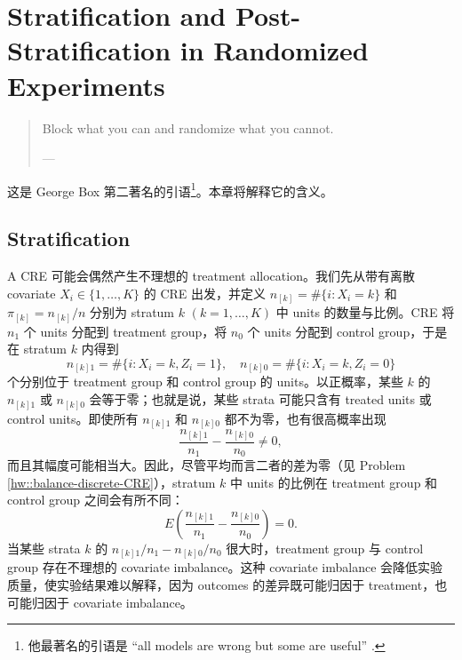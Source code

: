 
\chapter{Stratification and Post-Stratification in Randomized Experiments}
\label{chapter::stratification-poststratification}

\begin{quotation}
Block what you can and randomize what you cannot.  

--- \citet[][page 103]{box1978statistics}
\end{quotation}

这是 George Box 第二著名的引语\footnote{他最著名的引语是 ``all models are wrong but some are useful'' \citep[][page 202]{box1979robustness}.}。本章将解释它的含义。



\section{Stratification}



A CRE 可能会偶然产生不理想的 treatment allocation。我们先从带有离散 covariate $X_i   \in \{ 1, \ldots, K \}$ 的 CRE 出发，并定义 $n_{[k]} = \#\{ i: X_i    =k  \}$ 和 $\pi_{[k]} = n_{[k]} / n$ 分别为 stratum $k$ $(k=1, \ldots, K)$ 中 units 的数量与比例。CRE 将 $n_1$ 个 units 分配到 treatment group，将 $n_0$ 个 units 分配到 control group，于是在 stratum $k$ 内得到
$$
n_{[k]1} = \#\{ i: X_i   = k, Z_i = 1 \},\quad
n_{[k]0} = \#\{ i: X_i   = k, Z_i = 0 \}
$$
个分别位于 treatment group 和 control group 的 units。以正概率，某些 $k$ 的 $n_{[k]1}$ 或 $n_{[k]0}$ 会等于零；也就是说，某些 strata 可能只含有 treated units 或 control units。即使所有 $n_{[k]1}$ 和 $n_{[k]0}$ 都不为零，也有很高概率出现
\begin{equation}
\frac{  n_{[k]1} }{n_1}  -  \frac{  n_{[k]0} }{n_0} \neq 0 ,
\label{eq::covarianceimbK}
\end{equation} 
而且其幅度可能相当大。因此，尽管平均而言二者的差为零（见 Problem \ref{hw::balance-discrete-CRE}），stratum $k$ 中 units 的比例在 treatment group 和 control group 之间会有所不同：
\begin{equation}\label{eq::balance-discrete-CRE}
E\left(  \frac{  n_{[k]1} }{n_1}  -  \frac{  n_{[k]0} }{n_0} \right) = 0.
\end{equation}
当某些 strata $k$ 的 $n_{[k]1}  / n_1  -  n_{[k]0} / n_0$ 很大时，treatment group 与 control group 存在不理想的 covariate imbalance。这种 covariate imbalance 会降低实验质量，使实验结果难以解释，因为 outcomes 的差异既可能归因于 treatment，也可能归因于 covariate imbalance。



